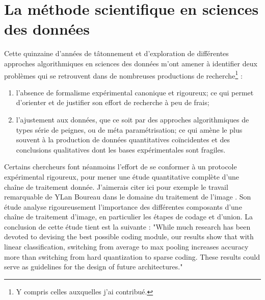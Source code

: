 \chapter{ \nmu La méthode scientifique en sciences des données} \label{chap:methode}


Cette quinzaine d'années de tâtonnement et d'exploration de différentes approches algorithmiques en sciences des données m'ont amener à identifier deux problèmes qui se retrouvent dans de nombreuses productions de recherche\footnote{Y compris celles auxquelles j'ai contribué.} :
\begin{enumerate}
  \item l'absence de formalisme expérimental canonique et rigoureux; ce qui permet d'orienter et de justifier son effort de recherche à peu de frais;
  \item l'ajustement aux données, que ce soit par des approches algorithmiques de types série de peignes, ou de méta paramétrisation; ce qui amène le plus souvent à la production de données quantitatives coïncidentes et des conclusions qualitatives dont les bases expérimentales sont fragiles.
\end{enumerate}


Certains chercheurs font néanmoins l'effort de se conformer à un protocole expérimental rigoureux, pour mener une étude quantitative complète d'une chaîne de traitement donnée. J'aimerais citer ici pour exemple le travail remarquable de YLan Boureau dans le domaine du traitement de l'image \cite{boureau2010learning}. Son étude analyse rigoureusement l'importance des différentes composants d'une chaîne de traitement d'image, en particulier les étapes de codage et d'union. La conclusion de cette étude tient est la suivante :  "While much research has been devoted to devising
the best possible coding module, our results show that with
linear classification, switching from average to max pooling
increases accuracy more than switching from hard quantization to sparse coding. These results could serve as guidelines for the design of future architectures."

